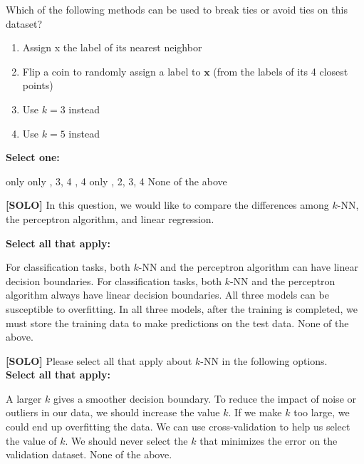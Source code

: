 \documentclass[11pt,addpoints,answers]{exam}
\newcommand{\xv}{\mathbf{x}}
\begin{document}
\begin{questions}
    Which of the following methods can be used to break ties or avoid ties on this dataset?
    
    \begin{enumerate}
        \item Assign x the label of its nearest neighbor
        \item Flip a coin to randomly assign a label to $\xv$ (from the labels of its 4 closest points)
        \item Use $k = 3$ instead
        \item Use $k = 5$ instead
    \end{enumerate}

    \textbf{Select one:}
    \begin{checkboxes}
         only
         only
        , 3, 4
        , 4
         only
        , 2, 3, 4
        \choice None of the above
    \end{checkboxes}
    
 
    
    \newpage
    
    \question[2] \textbf{[SOLO]} In this question, we would like to compare the differences among $k$-NN, the perceptron algorithm, and linear regression.
    
    {
    \checkboxchar{$\Box$} \checkedchar{$\blacksquare$}
    \textbf{Select all that apply:}
    \begin{checkboxes}
        \choice For classification tasks, both $k$-NN and the perceptron algorithm can have linear decision boundaries.
        \choice For classification tasks, both $k$-NN and the perceptron algorithm always have linear decision boundaries.
        \choice All three models can be susceptible to overfitting.
        \choice In all three models, after the training is completed, we must store the training data to make predictions on the test data.
        \choice None of the above.
    \end{checkboxes}
    }

    

    \question[3] \textbf{[SOLO]} Please select all that apply about $k$-NN in the following options. \\ \textbf{Select all that apply:}
    {
    \checkboxchar{$\Box$} \checkedchar{$\blacksquare$}
    \begin{checkboxes}
        \choice A larger $k$ gives a smoother decision boundary.
        \choice To reduce the impact of noise or outliers in our data, we should increase the value $k$.
        \choice If we make $k$ too large, we could end up overfitting the data.
        \choice We can use cross-validation to help us select the value of $k$.
        \choice We should never select the $k$ that minimizes the error on the validation dataset.
        \choice None of the above.
    \end{checkboxes}
    }


\end{questions}
\end{document}
